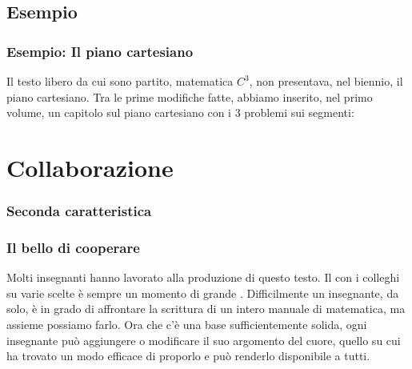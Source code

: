 \documentclass{beamer} %
\begin{document}
\subsection{Esempio} 


\begin{frame}\frametitle{Esempio: Il piano cartesiano}

Il testo libero da cui sono partito, matematica 
\(C^3\), non presentava, nel biennio, il piano cartesiano. 
Tra le prime modifiche fatte, abbiamo inserito, nel primo volume, un 
capitolo sul piano cartesiano con i 3 problemi sui segmenti:

\end{frame}


\section{Collaborazione}


\begin{frame}\frametitle{Seconda caratteristica}

\begin{center}  \end{center}

\end{frame}


\begin{frame}\frametitle{Il bello di cooperare}

Molti insegnanti hanno lavorato alla produzione di questo testo.
\spause
Il  con i colleghi su varie scelte è sempre un momento di 
grande .
\spause
Difficilmente un insegnante, da solo, è in grado di affrontare la scrittura 
di un intero manuale di matematica, ma assieme possiamo farlo.
\spause
Ora che c'è una base sufficientemente solida, ogni insegnante 
può aggiungere o modificare il suo argomento del cuore, quello su cui ha 
trovato un modo efficace di proporlo e può renderlo disponibile a tutti.

\end{frame}
\end{document}
